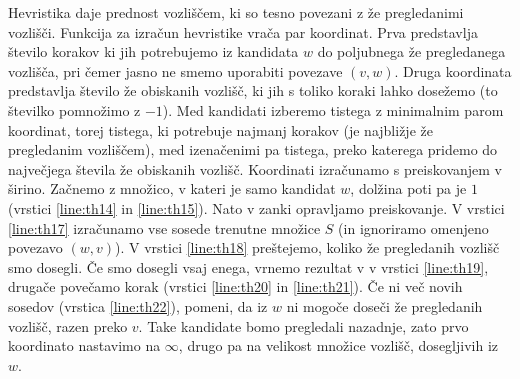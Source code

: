 \documentclass[a4paper, 12pt, ]{book}
\begin{document}
	Hevristika daje prednost vozliščem, ki so tesno povezani z že pregledanimi vozlišči. Funkcija za izračun hevristike vrača par koordinat. Prva predstavlja
	število korakov ki jih potrebujemo iz kandidata $w$ do poljubnega že pregledanega vozlišča, pri čemer jasno ne smemo uporabiti povezave $(v, w)$.
	Druga koordinata predstavlja število že obiskanih vozlišč, ki jih s toliko koraki lahko dosežemo (to številko pomnožimo z $-1$). Med kandidati izberemo
	tistega z minimalnim parom koordinat, torej tistega, ki potrebuje najmanj korakov (je najbližje že pregledanim vozliščem), med izenačenimi pa tistega,
	preko katerega pridemo do največjega števila že obiskanih vozlišč.
	Koordinati izračunamo s preiskovanjem v širino. Začnemo z množico, v kateri je samo kandidat $w$, dolžina poti pa je $1$ (vrstici \ref{line:th14} in
	\ref{line:th15}). Nato v zanki opravljamo preiskovanje. V vrstici \ref{line:th17} izračunamo vse sosede trenutne množice $S$ (in ignoriramo omenjeno
	povezavo $(w,v)$). V vrstici \ref{line:th18} preštejemo, koliko že pregledanih vozlišč smo dosegli. Če smo dosegli vsaj enega, vrnemo rezultat v
	v vrstici \ref{line:th19}, drugače povečamo korak (vrstici \ref{line:th20} in \ref{line:th21}). Če ni več novih sosedov (vrstica \ref{line:th22}), pomeni,
	da iz $w$ ni mogoče doseči že pregledanih vozlišč, razen preko $v$. Take kandidate bomo pregledali nazadnje, zato prvo koordinato nastavimo na 
	$\infty$, drugo pa na velikost množice vozlišč, dosegljivih iz $w$.
	
\end{document}
